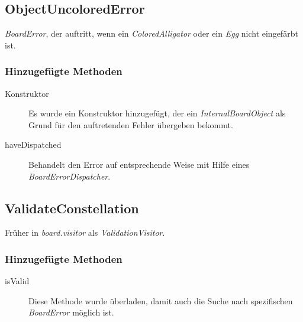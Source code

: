 \subsection{ObjectUncoloredError}
	\emph{BoardError}, der auftritt, wenn ein \emph{ColoredAlligator} oder ein \emph{Egg} nicht eingefärbt ist.
	\subsubsection{Hinzugefügte Methoden}
	\begin{description}
		\item[Konstruktor] Es wurde ein Konstruktor hinzugefügt, der ein \emph{InternalBoardObject} als Grund für den 
			auftretenden Fehler übergeben bekommt.
		\item[haveDispatched]
			Behandelt den Error auf entsprechende Weise mit Hilfe eines \emph{BoardErrorDispatcher}.
	\end{description}

\subsection{ValidateConstellation}
	Früher in \emph{board.visitor} als \emph{ValidationVisitor}.
	\subsubsection{Hinzugefügte Methoden}
	\begin{description}
		\item[isValid] Diese Methode wurde überladen, damit auch die Suche nach spezifischen \emph{BoardError} möglich ist.
	\end{description} 
